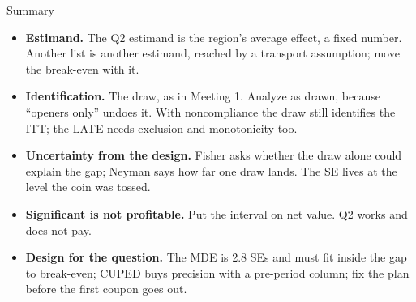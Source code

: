 \documentclass[aspectratio=169, 11pt, handout]{beamer}
\newcommand{\spinestep}[1]{\textcolor{sbgreen}{\textbf{#1}}}
\begin{document}
\begin{frame}{Summary}

\begin{itemize}
    \item \spinestep{Estimand.} The Q2 estimand is the region's average effect, a fixed number. Another list is another estimand, reached by a transport assumption; move the break-even with it.
    \item \spinestep{Identification.} The draw, as in Meeting 1. Analyze as drawn, because ``openers only'' undoes it. With noncompliance the draw still identifies the ITT; the LATE needs exclusion and monotonicity too.
    \item \spinestep{Uncertainty from the design.} Fisher asks whether the draw alone could explain the gap; Neyman says how far one draw lands. The SE lives at the level the coin was tossed.
    \item \textbf{Significant is not profitable.} Put the interval on net value. Q2 works and does not pay.
    \item \textbf{Design for the question.} The MDE is 2.8 SEs and must fit inside the gap to break-even; CUPED buys precision with a pre-period column; fix the plan before the first coupon goes out.
\end{itemize}
\end{frame}
\end{document}
